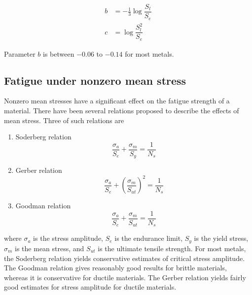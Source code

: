 \documentclass[
10pt,
a4paper,
openany,
svgnames,
]{book}
\begin{document}
\begin{align*}
  b &= - \frac{1}{3} \log \dfrac{S_l}{S_e} \\
  c &= \log \dfrac{S_l^2}{S_e}
\end{align*}

Parameter $b$ is between $-0.06$ to $-0.14$ for most metals.

\subsection{Fatigue under nonzero mean stress}

Nonzero mean stresses have a significant effect on the fatigue strength of a material. There have been several relations proposed to describe the effects of mean stress. Three of such relations are

\begin{enumerate}
\item Soderberg relation
  \begin{equation}
    \frac{\sigma_a}{S_e} + \frac{\sigma _m}{S_y} = \frac{1}{N_s}
  \end{equation}
\item Gerber relation
  \begin{equation}
    \frac{\sigma_a}{S_e} + \left( \frac{\sigma_m}{S_{ut}} \right)^2 = \frac{1}{N_s}
  \end{equation}
\item Goodman relation
  \begin{equation}
    \frac{\sigma_a}{S_e} + \frac{\sigma _m}{S_{ut}} = \frac{1}{N_s}
  \end{equation}
\end{enumerate}

where $\sigma_a$ is the stress amplitude, $S_e$ is the endurance limit, $S_y$ is the yield stress, $\sigma_m$ is the mean stress, and $S_{ut}$ is the ultimate tensile strength. For most metals, the Soderberg relation yields conservative estimates of critical stress amplitude. The Goodman relation gives reasonably good results for brittle materials, whereas it is conservative for ductile materials. The Gerber relation yields fairly good estimates for stress amplitude for ductile materials.
\end{document}
